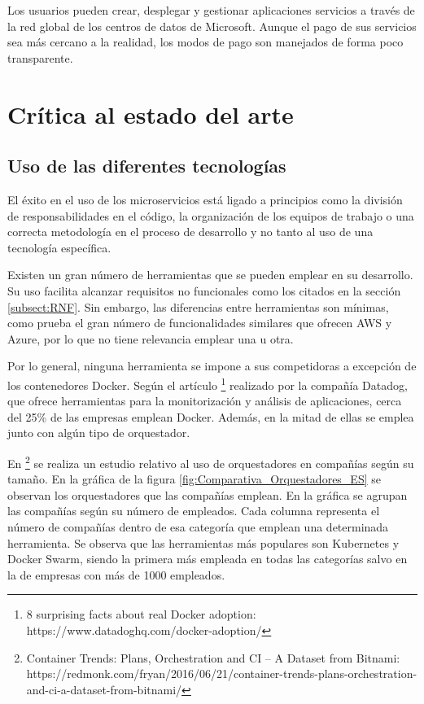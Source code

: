 \documentclass[11pt,spanish,listoffigures]{tfgetsinf}
\begin{document}
Los usuarios pueden crear, desplegar y gestionar aplicaciones  servicios a través de la red global de los centros de datos de Microsoft. Aunque el pago de sus servicios sea más cercano a la realidad, los modos de pago son manejados de forma poco transparente.

\section{Crítica al estado del arte}

\subsection{Uso de las diferentes tecnologías}

El éxito en el uso de los microservicios está ligado a principios como la división de responsabilidades en el código, la organización de los equipos de trabajo o una correcta metodología en el proceso de desarrollo y no tanto al uso de una tecnología específica. 

Existen un gran número de herramientas que se pueden emplear en su desarrollo. Su uso facilita alcanzar requisitos no funcionales como los citados en la sección \ref{subsect:RNF}. Sin embargo, las diferencias entre herramientas son mínimas, como prueba el gran número de funcionalidades similares que ofrecen AWS y Azure, por lo que no tiene relevancia emplear una u otra. 

Por lo general, ninguna herramienta se impone a sus competidoras a excepción de los contenedores Docker. Según el artículo \footnote{ 8 surprising facts about real Docker adoption: https://www.datadoghq.com/docker-adoption/} realizado por la compañía Datadog, que ofrece herramientas para la monitorización y análisis de aplicaciones, cerca del 25\% de las empresas emplean Docker. Además, en la mitad de ellas se emplea junto con algún tipo de orquestador. 

En \footnote{ Container Trends: Plans, Orchestration and CI – A Dataset from Bitnami: https://redmonk.com/fryan/2016/06/21/container-trends-plans-orchestration-and-ci-a-dataset-from-bitnami/} se realiza un estudio relativo al uso de orquestadores en compañías según su tamaño. En la gráfica de la figura \ref{fig:Comparativa_Orquestadores_ES} se observan los orquestadores que las compañías emplean. En la gráfica se agrupan las compañías según su número de empleados. Cada columna representa el número de compañías dentro de esa categoría que emplean una determinada herramienta. Se observa que las herramientas más populares son Kubernetes y Docker Swarm, siendo la primera más empleada en todas las categorías salvo en la de empresas con más de 1000 empleados.
\end{document}
